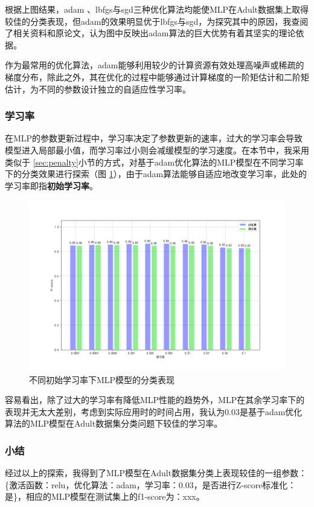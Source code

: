 \documentclass[12pt,a4paper]{article}
\theoremstyle{definition}
\begin{document}
根据上图结果，adam \cite{adam}、lbfgs与sgd三种优化算法均能使MLP在Adult数据集上取得较佳的分类表现，但adam的效果明显优于lbfgs与sgd，为探究其中的原因，我查阅了相关资料和原论文，认为图中反映出adam算法的巨大优势有着其坚实的理论依据。

\vspace{0.01\linewidth}
作为最常用的优化算法，adam能够利用较少的计算资源有效处理高噪声或稀疏的梯度分布，除此之外，其在优化的过程中能够通过计算梯度的一阶矩估计和二阶矩估计，为不同的参数设计独立的自适应性学习率。

\subsubsection{学习率}

在MLP的参数更新过程中，学习率决定了参数更新的速率，过大的学习率会导致模型进入局部最小值，而学习率过小则会减缓模型的学习速度。在本节中，我采用类似于 \ref{sec:penalty}小节的方式，对基于adam优化算法的MLP模型在不同学习率下的分类效果进行探索（图 \ref{fig:lr}），由于adam算法能够自适应地改变学习率，此处的学习率即指\textbf{初始学习率}。

\begin{figure}[H]
	\centering
	\includegraphics[width=0.75\linewidth]{img/mlp_lr.png}
	\caption{不同初始学习率下MLP模型的分类表现}
	\label{fig:lr}
\end{figure}

容易看出，除了过大的学习率有降低MLP性能的趋势外，MLP在其余学习率下的表现并无太大差别，考虑到实际应用时的时间占用，我认为0.03是基于adam优化算法的MLP模型在Adult数据集分类问题下较佳的学习率。

\subsubsection{小结}

经过以上的探索，我得到了MLP模型在Adult数据集分类上表现较佳的一组参数：\{激活函数：relu，优化算法：adam，学习率：0.03，是否进行Z-score标准化：是\}，相应的MLP模型在测试集上的f1-score为：xxx。
\end{document}
